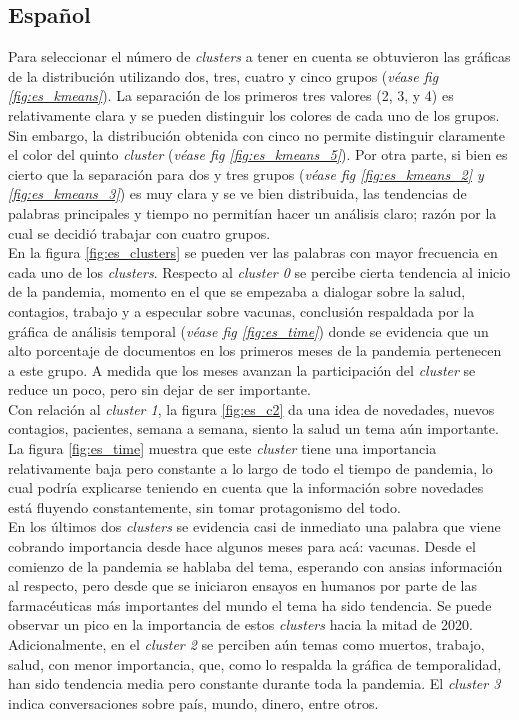 \subsection{Español}

Para seleccionar el número de \textit{clusters} a tener en cuenta se obtuvieron las gráficas de la distribución utilizando dos, tres, cuatro y cinco grupos (\textit{véase fig \ref{fig:es_kmeans}}). La separación de los primeros tres valores (2, 3, y 4) es relativamente clara y se pueden distinguir los colores de cada uno de los grupos. Sin embargo, la distribución obtenida con cinco no permite distinguir claramente el color del quinto \textit{cluster} (\textit{véase fig \ref{fig:es_kmeans_5}}). Por otra parte, si bien es cierto que la separación para dos y tres grupos (\textit{véase fig \ref{fig:es_kmeans_2} y \ref{fig:es_kmeans_3}}) es muy clara y se ve bien distribuida, las tendencias de palabras principales y tiempo no permitían hacer un análisis claro; razón por la cual se decidió trabajar con cuatro grupos.\\

En la figura \ref{fig:es_clusters} se pueden ver las palabras con mayor frecuencia en cada uno de los \textit{clusters}. Respecto al \textit{cluster 0} se percibe cierta tendencia al inicio de la pandemia, momento en el que se empezaba a dialogar sobre la salud, contagios, trabajo y a especular sobre vacunas, conclusión respaldada por la gráfica de análisis temporal (\textit{véase fig \ref{fig:es_time}}) donde se evidencia que un alto porcentaje de documentos en los primeros meses de la pandemia pertenecen a este grupo. A medida que los meses avanzan la participación del \textit{cluster} se reduce un poco, pero sin dejar de ser importante.\\

Con relación al \textit{cluster 1}, la figura \ref{fig:es_c2} da una idea de novedades, nuevos contagios, pacientes, semana a semana, siento la salud un tema aún importante. La figura \ref{fig:es_time} muestra que este \textit{cluster} tiene una importancia relativamente baja pero constante a lo largo de todo el tiempo de pandemia, lo cual podría explicarse teniendo en cuenta que la información sobre novedades está fluyendo constantemente, sin tomar protagonismo del todo.\\

En los últimos dos \textit{clusters} se evidencia casi de inmediato una palabra que viene cobrando importancia desde hace algunos meses para acá: vacunas. Desde el comienzo de la pandemia se hablaba del tema, esperando con ansias información al respecto, pero desde que se iniciaron ensayos en humanos por parte de las farmacéuticas más importantes del mundo el tema ha sido tendencia. Se puede observar un pico en la importancia de estos \textit{clusters} hacia la mitad de 2020. Adicionalmente, en el \textit{cluster 2} se perciben aún temas como muertos, trabajo, salud, con menor importancia, que, como lo respalda la gráfica de temporalidad, han sido tendencia media pero constante durante toda la pandemia. El \textit{cluster 3} indica conversaciones sobre país, mundo, dinero, entre otros.

